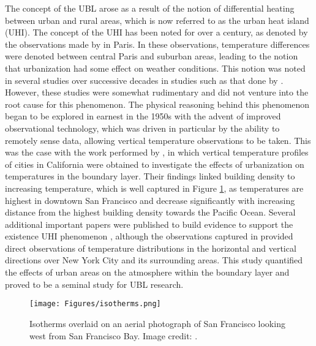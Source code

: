 The concept of the UBL arose as a result of the notion of differential heating between urban and rural areas, which is now referred to as the urban heat island (UHI). The concept of the UHI has been noted for over a century, as denoted by the observations made by \citet{renou1862differences} in Paris. In these observations, temperature differences were denoted between central Paris and suburban areas, leading to the notion that urbanization had some effect on weather conditions. This notion was noted in several studies over successive decades in studies such as that done by \citet{hammon1902abstract}. However, these studies were somewhat rudimentary and did not venture into the root cause for this phenomenon. The physical reasoning behind this phenomenon began to be explored in earnest in the 1950s with the advent of improved observational technology, which was driven in particular by the ability to remotely sense data, allowing vertical temperature observations to be taken. This was the case with the work performed by \citet{duckworth1954effect}, in which vertical temperature profiles of cities in California were obtained to investigate the effects of urbanization on temperatures in the boundary layer. Their findings linked building density to increasing temperature, which is well captured in Figure \ref{fig:sf_isotherms}, as temperatures are highest in downtown San Francisco and decrease significantly with increasing distance from the highest building density towards the Pacific Ocean. Several additional important papers were published to build evidence to support the existence UHI phenomenon \citep{mitchell1961temperature, oke1973city, sundborg1950local}, although the observations captured in \citet{bornstein1968observations} provided direct observations of temperature distributions in the horizontal and vertical directions over New York City and its surrounding areas. This study quantified the effects of urban areas on the atmosphere within the boundary layer and proved to be a seminal study for UBL research.

\begin{figure}[ht]
	\centering
	\texttt{[image: Figures/isotherms.png]}
	\caption{Isotherms overlaid on an aerial photograph of San Francisco looking west from San Francisco Bay. Image credit: \citet{duckworth1954effect}.}
	\label{fig:sf_isotherms}
\end{figure}

